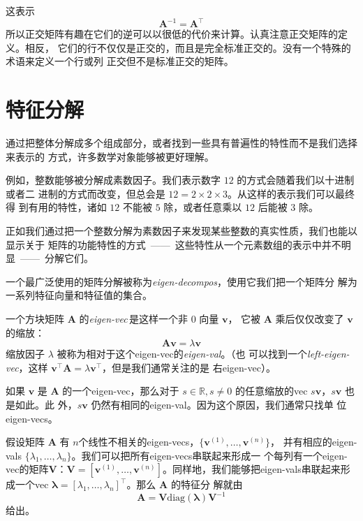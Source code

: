 这表示
\begin{equation}
  \pmb{A}^{-1} = \pmb{A}^{\top}
\end{equation}
所以正交矩阵有趣在它们的逆可以以很低的代价来计算。认真注意正交矩阵的定义。相反，
它们的行不仅仅是正交的，而且是完全标准正交的。没有一个特殊的术语来定义一个行或列
正交但不是标准正交的矩阵。

\section{特征分解}
\label{sec:eigendecomposition}

通过把整体分解成多个组成部分，或者找到一些具有普遍性的特性而不是我们选择来表示的
方式，许多数学对象能够被更好理解。

例如，整数能够被分解成素数因子。我们表示数字 $12$ 的方式会随着我们以十进制或者二
进制的方式而改变，但总会是 $12 = 2 \times 2 \times 3$。从这样的表示我们可以最终得
到有用的特性，诸如 $12$ 不能被 $5$ 除，或者任意乘以 $12$ 后能被 $3$ 除。

正如我们通过把一个整数分解为素数因子来发现某些整数的真实性质，我们也能以显示关于
矩阵的功能特性的方式~——~这些特性从一个元素数组的表示中并不明显~——~分解它们。

一个最广泛使用的矩阵分解被称为\emph{\gls{eigen-decompos}}，使用它我们把一个矩阵分
解为一系列特征向量和特征值的集合。

一个方块矩阵 $\pmb{A}$ 的\emph{\gls{eigen-vec}}\,是这样一个非 $0$ 向量 $\pmb{v}$，
它被 $\pmb{A}$ 乘后仅仅改变了 $\pmb{v}$ 的缩放：
\begin{equation}
  \pmb{A}\pmb{v} = \lambda\pmb{v}
\end{equation}
缩放因子 $\lambda$ 被称为相对于这个\gls*{eigen-vec}的\emph{\gls{eigen-val}}。（也
可以找到一个\emph{\gls{left-eigen-vec}}，这样
$\pmb{v}^{\top}\pmb{A} = \lambda\pmb{v}^{\top}$，但是我们通常关注的是
右\gls*{eigen-vec}）。

如果 $\pmb{v}$ 是 $\pmb{A}$ 的一个\gls*{eigen-vec}，那么对于 $s \in \mathbb{R},
s \neq 0$ 的任意缩放的\gls*{vec} $s\pmb{v}$，$s\pmb{v}$ 也是如此。此
外，$s\pmb{v}$ 仍然有相同的\gls*{eigen-val}。因为这个原因，我们通常只找单
位\gls*{eigen-vecs}。

假设矩阵 $\pmb{A}$ 有
$n$个线性不相关的\gls*{eigen-vecs}，$\{\pmb{v}^{(1)}, \ldots, \pmb{v}^{(n)}\}$，
并有相应的\gls*{eigen-vals}
$\{\lambda_1, \ldots, \lambda_n\}$。我们可以把所有\gls*{eigen-vecs}串联起来形成一
个每列有一个\gls*{eigen-vec}的矩阵$\pmb{V}$：$\pmb{V} = [\pmb{v}^{(1)}, \ldots,
\pmb{v}^{(n)}]$。同样地，我们能够把\gls*{eigen-vals}串联起来形成一个\gls*{vec}
$\pmb{\lambda} = [\lambda_1, \ldots, \lambda_n]^{\top}$。那么 $\pmb{A}$ 的特征分
解就由
\begin{equation}
  \pmb{A} = \pmb{V}\mathrm{diag}(\pmb{\lambda})\pmb{V}^{-1}
\end{equation}
给出。

